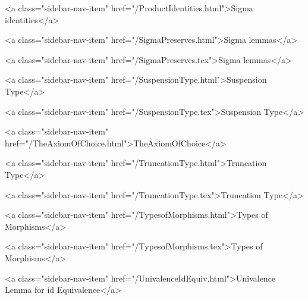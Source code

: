       
        
          <a class="sidebar-nav-item" href="/ProductIdentities.html">Sigma identities</a>
        
      
    
      
        
          <a class="sidebar-nav-item" href="/SigmaPreserves.html">Sigma lemmas</a>
        
      
    
      
        
          <a class="sidebar-nav-item" href="/SigmaPreserves.tex">Sigma lemmas</a>
        
      
    
      
        
          <a class="sidebar-nav-item" href="/SuspensionType.html">Suspension Type</a>
        
      
    
      
        
          <a class="sidebar-nav-item" href="/SuspensionType.tex">Suspension Type</a>
        
      
    
      
        
          <a class="sidebar-nav-item" href="/TheAxiomOfChoice.html">TheAxiomOfChoice</a>
        
      
    
      
        
          <a class="sidebar-nav-item" href="/TruncationType.html">Truncation Type</a>
        
      
    
      
        
          <a class="sidebar-nav-item" href="/TruncationType.tex">Truncation Type</a>
        
      
    
      
        
          <a class="sidebar-nav-item" href="/TypesofMorphisms.html">Types of Morphisms</a>
        
      
    
      
        
          <a class="sidebar-nav-item" href="/TypesofMorphisms.tex">Types of Morphisms</a>
        
      
    
      
        
          <a class="sidebar-nav-item" href="/UnivalenceIdEquiv.html">Univalence Lemma for id Equivalence</a>
        
